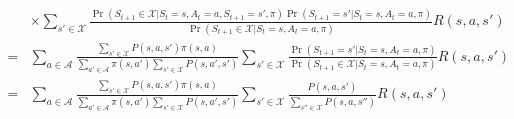 \documentclass[]{article}
\begin{document}
\begin{enumerate}
{\begin{align}
				& \times \sum_{s' \in \mathcal X} \frac{\Pr(S_{t+1} \in \mathcal X | S_t = s, A_t = a, S_{t+1} = s', \pi) \Pr(S_{t+1} = s' | S_t = s, A_t = a, \pi)}{\Pr(S_{t+1} \in \mathcal X | S_t = s, A_t = a, \pi)} R(s, a, s') \\
				=& \sum_{a \in \mathcal A} \frac{\sum_{s' \in \mathcal X} P(s, a, s') \pi(s, a)}{\sum_{a' \in \mathcal A} \pi(s, a') \sum_{s' \in \mathcal X} P(s, a', s')} \sum_{s' \in \mathcal X} \frac{\Pr(S_{t+1} = s' | S_t = s, A_t = a, \pi)}{\Pr(S_{t+1} \in \mathcal X | S_t = s, A_t = a, \pi)} R(s, a, s') \\
				=& \sum_{a \in \mathcal A} \frac{\sum_{s' \in \mathcal X} P(s, a, s') \pi(s, a)}{\sum_{a' \in \mathcal A} \pi(s, a') \sum_{s' \in \mathcal X} P(s, a', s')} \sum_{s' \in \mathcal X} \frac{P(s, a, s')}{\sum_{s'' \in \mathcal X} P(s, a, s'')} R(s, a, s')
			    \end{align}

}
\end{enumerate}
\end{document}

